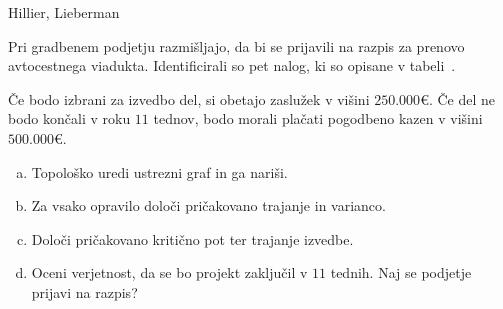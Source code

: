 \begin{naloga}{Hillier, Lieberman}{\cite[Problem~10.4-4]{hl}}
\begin{vprasanje}[viadukt]
Pri gradbenem podjetju razmišljajo,
da bi se prijavili na razpis za prenovo avto\-cest\-ne\-ga viadukta.
Identificirali so pet nalog, ki so opisane v tabeli~\tab{}.

Če bodo izbrani za izvedbo del, si obetajo zaslužek v višini $250.000 €$.
Če del ne bodo končali v roku $11$ tednov,
bodo morali plačati pogodbeno kazen v višini $500.000 €$.
\begin{enumerate}[(a)]
\item Topološko uredi ustrezni graf in ga nariši.
\item Za vsako opravilo določi pričakovano trajanje in varianco.
\item Določi pričakovano kritično pot ter trajanje izvedbe.
\item Oceni verjetnost, da se bo projekt zaključil v $11$ tednih.
Naj se podjetje prijavi na razpis?
\end{enumerate}

\begin{tabela}
\end{tabela}
\end{vprasanje}
\begin{odgovor}
\end{odgovor}
\end{naloga}


